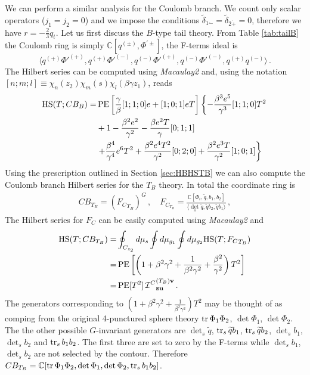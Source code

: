 \documentclass[main.tex]{subfiles}
\begin{document}
We can perform a similar analysis for the Coulomb branch. We count only scalar operators ($j_1=j_2=0$) and we impose the conditions $\widetilde{\delta}_{1\dot-}=\widetilde{\delta}_{2\dot+}=0$, therefore we have $r=-\frac{2}{3}q_t$. Let us first discuss the $B$-type tail theory. From Table \ref{tab:tailB} the Coulomb ring is simply $\mathbb{C}[q^{(\pm)},\Phi^{'{\pm}}]$, the F-terms ideal is 
\begin{equation}
\langle q^{(+)}{\Phi'}^{(+)},q^{(+)}{\Phi'}^{(-)},q^{(-)}{\Phi'}^{(+)},q^{(-)}{\Phi'}^{(-)},q^{(+)}{q}^{(-)}\rangle\,.
\end{equation}
The Hilbert series can be computed using \textit{Macaulay2} and, using the notation \newline$[n;m;l]\equiv\chi_n(z_2)\chi_m(s)\chi_l(\beta\gamma z_1)$, reads
\begin{equation}
\begin{aligned}
\textrm{HS}(T;CB_{B})=&\operatorname{\mathrm{PE}}\left[\frac{\gamma}{\beta}[1;1;0]e+[1;0;1]eT\right]\left\{-\frac{\beta ^3 e^5 }{\gamma ^3}[1;1;0]T^2\right.\\
&+1-\frac{\beta ^2 e^2}{\gamma ^2}-\frac{\beta  e^2
   T}{\gamma}[0;1;1]\\
&\left.+\frac{\beta ^4 }{\gamma ^4}e^6 T^2+\frac{\beta ^2 e^4 T^2}{\gamma ^2}[0;2;0]+\frac{\beta ^2 e^3 T}{\gamma ^2}[1;0;1]\right\}
\end{aligned}
\end{equation}
Using the prescription outlined in Section \ref{sec:HBHSTB} we can also compute the Coulomb branch Hilbert series for the $T_B$ theory. In total the coordinate ring is
\begin{gather}
CB_{T_B}=({F_C}_{T_B})^G\,,\quad F_{C_{T_B}}=\frac{\mathbb{C}[\Phi_i,\widetilde{q},b_1,b_2]}{\langle\det_s\widetilde{q},\widetilde{q}b_2,\widetilde{q}b_1\rangle}\,,
\end{gather}
The Hilbert series for $F_C$ can be easily computed using \textit{Macaulay2} and
\begin{align}
\textrm{HS}(T;CB_{T_B})=&\oint_{C_{z_2}}d\mu_s\oint d\mu_{g_1}\oint d\mu_{g_2}\textrm{HS}(T;{F_C}_{T_B})\\
=&\operatorname{\mathrm{PE}}\left[\left(1+\beta^2\gamma^2+\frac{1}{\beta^2\gamma^2}+\frac{\beta^2}{\gamma^2}\right)T^2\right]\\
=&\operatorname{\mathrm{PE}}[T^2]\, {\mathcal{I}^C}  ^{(T_B)\mathbf{v}}_{\mathbf{z}\mathbf{u}}\,.
\end{align}
The generators corresponding to $\left(1+\beta^2\gamma^2+\frac{1}{\beta^2\gamma^2}\right)T^2$ may be thought of as comping from the original 4-punctured sphere theory $\operatorname{tr}\Phi_1\Phi_2$, $\det\Phi_1$, $\det\Phi_2$. The the other possible $G$-invariant generators are $\det_s\widetilde{q}$, $\operatorname{tr}_s\widetilde{q}b_1$, $\operatorname{tr}_s\widetilde{q}b_2$, $\det_sb_1$, $\det_sb_2$ and $\operatorname{tr}_sb_1b_2$. The first three are set to zero by the F-terms while $\det_sb_1$, $\det_sb_2$ are not selected by the contour. Therefore
\newline$CB_{T_B}=\mathbb{C}[\operatorname{tr}\Phi_1\Phi_2,\det\Phi_1,\det\Phi_2,\operatorname{tr}_sb_1b_2]$.
\end{document}
